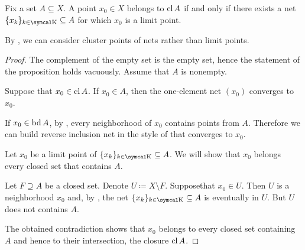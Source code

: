 \begin{proposition}\label{thm:limit_point_iff_in_closure}
  Fix a set \( A \subseteq X \). A point \( x_0 \in X \) belongs to \( \operatorname{cl}{A} \) if and only if there exists a net \( \{ x_k \}_{k \in \CK} \subseteq A \) for which \( x_0 \) is a limit point.

  By , we can consider cluster points of nets rather than limit points.
\end{proposition}
\begin{proof}
  The complement of the empty set is the empty set, hence the statement of the proposition holds vacuously. Assume that \( A \) is nonempty.

  \Sufficiency Suppose that \( x_0 \in \operatorname{cl}{A} \). If \( x_0 \in A \), then the one-element net \( (x_0) \) converges to \( x_0 \).

  If \( x_0 \in \operatorname{bd}{A} \), by , every neighborhood of \( x_0 \) contains points from \( A \). Therefore we can build reverse inclusion net in the style of  that converges to \( x_0 \).

  \Necessity Let \( x_0 \) be a limit point of \( \{ x_k \}_{k \in \CK} \subseteq A \). We will show that \( x_0 \) belongs every closed set that contains \( A \).

  Let \( F \supseteq A \) be a closed set. Denote \( U \coloneqq X \setminus F \). Suppose\LEM that \( x_0 \in U \). Then \( U \) is a neighborhood \( x_0 \) and, by , the net \( \{ x_k \}_{k \in \CK} \subseteq A \) is eventually in \( U \). But \( U \) does not contains \( A \).

  The obtained contradiction shows that \( x_0 \) belongs to every closed set containing \( A \) and hence to their intersection, the closure \( \operatorname{cl} A \).
\end{proof}

